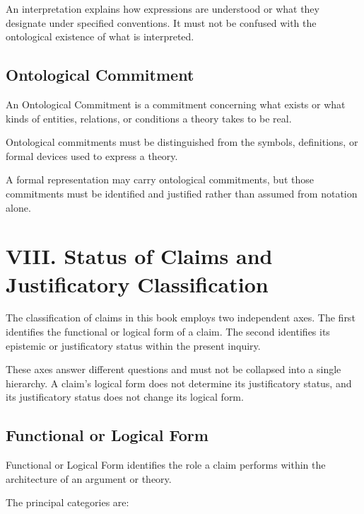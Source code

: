 An interpretation explains how expressions are understood or what
they designate under specified conventions. It must not be confused
with the ontological existence of what is interpreted.


\subsection*{Ontological Commitment}

An Ontological Commitment is a commitment concerning what exists
or what kinds of entities, relations, or conditions a theory takes
to be real.

Ontological commitments must be distinguished from the symbols,
definitions, or formal devices used to express a theory.

A formal representation may carry ontological commitments, but
those commitments must be identified and justified rather than
assumed from notation alone.



\section*{VIII. Status of Claims and Justificatory Classification}


The classification of claims in this book employs two independent
axes. The first identifies the functional or logical form of a claim.
The second identifies its epistemic or justificatory status within
the present inquiry.

These axes answer different questions and must not be collapsed
into a single hierarchy. A claim's logical form does not determine
its justificatory status, and its justificatory status does not
change its logical form.


\subsection*{Functional or Logical Form}

Functional or Logical Form identifies the role a claim performs
within the architecture of an argument or theory.

The principal categories are:

